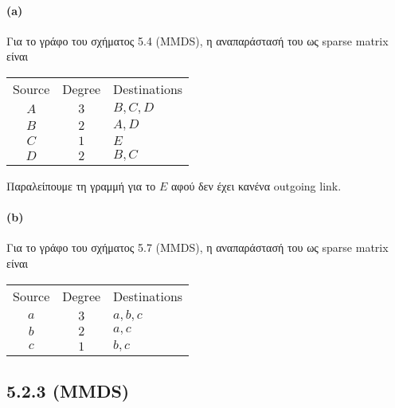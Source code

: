 \documentclass[a4paper,11pt]{article}
\begin{document}
\paragraph{(a)} Για το γράφο του σχήματος 5.4 (MMDS), η αναπαράστασή του ως sparse matrix είναι
\begin{center}
	\begin{tabular}{| c | c | l |}
		\hline
		Source & Degree & Destinations \\ \hhline{|=|=|=|}
		$A$ & $3$ & $B,C,D$ \\
		$B$ & $2$ & $A,D$ \\
		$C$ & $1$ & $E$ \\
		$D$ & $2$ & $B,C$ \\
		\hline
	\end{tabular}
\end{center}
Παραλείπουμε τη γραμμή για το $E$ αφού δεν έχει κανένα outgoing link.

\paragraph{(b)} Για το γράφο του σχήματος 5.7 (MMDS), η αναπαράστασή του ως sparse matrix είναι
\begin{center}
	\begin{tabular}{| c | c | l |}
		\hline
		Source & Degree & Destinations \\ \hhline{|=|=|=|}
		$a$ & $3$ & $a,b,c$ \\
		$b$ & $2$ & $a,c$ \\
		$c$ & $1$ & $b,c$ \\
		\hline
	\end{tabular}
\end{center}

\subsection*{5.2.3 (MMDS)}
\end{document}

